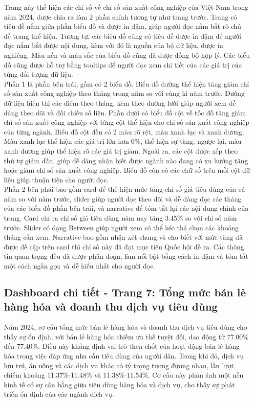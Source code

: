 \documentclass[a4paper]{report}
\begin{document}
{{Trang này thể hiện các chỉ số về chỉ số sản xuất công nghiệp của Việt Nam trong năm 2024, được chia ra làm 2 phần chính tương tự như trang trước. Trang có tiêu đề nằm giữa phần biểu đồ và được in đậm, giúp người đọc nắm bắt rõ chủ đề trang thể hiện. Tương tự, các biểu đồ cũng có tiêu đề được in đậm để người đọc nắm bắt được nội dung, kèm với đó là nguồn của bộ dữ liệu, được in nghiêng. Màu nền và màu sắc của biểu đồ cũng đã được đồng bộ hợp lý. Các biểu đồ cũng được hỗ trợ bằng tooltips để người đọc xem chi tiết của các giá trị của từng đối tượng dữ liệu. \\
Phần 1 là phần bên trái, gồm có 2 biểu đồ. Biểu đồ đường thể hiện tăng giảm chỉ số sản xuất công nghiệp theo tháng trong năm so với cùng kì năm trước. Đường dữ liệu hiển thị các điểm theo tháng, kèm theo đường lưới giúp người xem dễ dàng theo dõi và đối chiếu số liệu. Phần dưới có biểu đồ cột về tốc đồ tăng giảm chỉ số sản xuất công nghiệp với từng cột thể hiện cho chỉ số sản xuất công nghiệp của từng ngành. Biểu đồ cột đều có 2 màu rõ rệt, màu xanh lục và xanh dương. Màu xanh lục thể hiện các giá trị lớn hơn 0\%, thể hiện sự tăng, ngược lại, màu xanh dương giúp thể hiện rõ các giá trị giảm. Ngoài ra, các cột được xếp theo thứ tự giảm dần, giúp dễ dàng nhận biết được ngành nào đang có xu hướng tăng hoặc giảm chỉ số sản xuất công nghiệp. Biểu đồ còn có các chữ số trên mỗi cột dữ liệu giúp thuận tiện cho người đọc. \\
Phần 2 bên phải bao gồm card để thể hiện mức tăng chỉ số giá tiêu dùng của cả năm so với năm trước, slider giúp người đọc theo dõi và dễ dàng đọc các tháng của các biểu đồ phần bên trái, và narrative để tóm tắt lại các nội dung chính của trang. Card chỉ ra chỉ số giá tiêu dùng năm nay tăng 3.45\% so với chỉ số năm trước. Slider có dạng Between giúp người xem có thể kéo thả chọn các khoảng tháng cần xem. Narrative bao gồm nhận xét chung và cho biết với mức tăng đã được đề cập trên card thì chỉ số này đã đạt mục tiêu Quốc hội đề ra. Các thông tin quan trọng đều đã được phân đoạn, làm nổi bật bằng cách in đậm và tóm tắt một cách ngắn gọn và dễ hiểu nhất cho người đọc.
\newpage
\subsection{Dashboard chi tiết - Trang 7: Tổng mức bán lẻ hàng hóa và doanh thu dịch vụ tiêu dùng}

Năm 2024, cơ cấu tổng mức bán lẻ hàng hóa và doanh thu dịch vụ tiêu dùng cho thấy sự ổn định, với bán lẻ hàng hóa chiếm ưu thế tuyệt đối, dao động từ 77.00\% đến 77.40\%. Điều này khẳng định vai trò then chốt của hoạt động bán lẻ hàng hóa trong việc đáp ứng nhu cầu tiêu dùng của người dân. Trong khi đó, dịch vụ lưu trú, ăn uống và các dịch vụ khác có tỷ trọng tương đương nhau, lần lượt chiếm khoảng 11.37\%-11.48\% và 11.38\%-11.54\%. Cơ cấu này phản ánh một nền kinh tế có sự cân bằng giữa tiêu dùng hàng hóa và dịch vụ, cho thấy sự phát triển ổn định của các ngành dịch vụ.\\

}}
\end{document}
